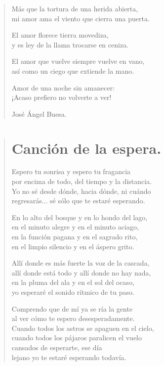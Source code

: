 \documentclass[11pt, portrait, twoside, notitlepage, openright]{book}
\begin{document}
\begin{verse}
Más que la tortura de una herida abierta,\\
mi amor ama el viento que cierra una puerta.

El amor florece tierra movediza,\\
y es ley de la llama trocarse en ceniza.

El amor que vuelve siempre vuelve en vano,\\
así como un ciego que extiende la mano.

Amor de una noche sin amanecer:\\
¡Acaso prefiero no volverte a ver!

José Ángel Buesa.
\end{verse}

\newpage
\begin{verse}
\begin{center}
\section{Canción de la espera.}
\end{center}
Espero tu sonrisa y espero tu fragancia\\
por encima de todo, del tiempo y la distancia.\\
Yo no sé desde dónde, hacia dónde, ni cuándo\\
regresarás... sé sólo que te estaré esperando.
\newline

En lo alto del bosque y en lo hondo del lago,\\
en el minuto alegre y en el minuto aciago,\\
en la función pagana y en el sagrado rito,\\
en el limpio silencio y en el áspero grito.
\newline

Allí donde es más fuerte la voz de la cascada,\\
allí donde está todo y allí donde no hay nada,\\
en la pluma del ala y en el sol del ocaso,\\
yo esperaré el sonido rítmico de tu paso.
\newline

Comprendo que de mí ya se ría la gente\\
al ver cómo te espero desesperadamente.\\
Cuando todos los astros se apaguen en el cielo,\\
cuando todos los pájaros paralicen el vuelo\\
cansados de esperarte, ese día\\
lejano yo te estaré esperando todavía.
\newpage


\end{verse}
\end{document}
